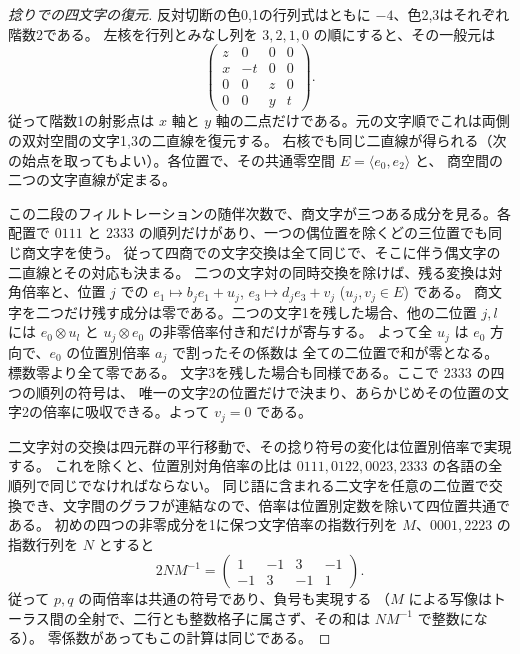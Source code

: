 \begin{proof}[捻りでの四文字の復元]
反対切断の色0,1の行列式はともに $-4$、色2,3はそれぞれ階数2である。
左核を行列とみなし列を $3,2,1,0$ の順にすると、その一般元は
\[
 \begin{pmatrix}z&0&0&0\\x&-t&0&0\\0&0&z&0\\0&0&y&t\end{pmatrix}.
\]
従って階数1の射影点は $x$ 軸と $y$ 軸の二点だけである。元の文字順でこれは両側の双対空間の文字1,3の二直線を復元する。
右核でも同じ二直線が得られる（次の始点を取ってもよい）。各位置で、その共通零空間 $E=\langle e_0,e_2\rangle$ と、
商空間の二つの文字直線が定まる。

この二段のフィルトレーションの随伴次数で、商文字が三つある成分を見る。各配置で
$0111$ と $2333$ の順列だけがあり、一つの偶位置を除くどの三位置でも同じ商文字を使う。
従って四商での文字交換は全て同じで、そこに伴う偶文字の二直線とその対応も決まる。
二つの文字対の同時交換を除けば、残る変換は対角倍率と、位置 $j$ での
$e_1\mapsto b_j e_1+u_j$, $e_3\mapsto d_j e_3+v_j$ ($u_j,v_j\in E$) である。
商文字を二つだけ残す成分は零である。二つの文字1を残した場合、他の二位置 $j,l$ には
$e_0\otimes u_l$ と $u_j\otimes e_0$ の非零倍率付き和だけが寄与する。
よって全 $u_j$ は $e_0$ 方向で、$e_0$ の位置別倍率 $a_j$ で割ったその係数は
全ての二位置で和が零となる。標数零より全て零である。
文字3を残した場合も同様である。ここで $2333$ の四つの順列の符号は、
唯一の文字2の位置だけで決まり、あらかじめその位置の文字2の倍率に吸収できる。よって $v_j=0$ である。

二文字対の交換は四元群の平行移動で、その捻り符号の変化は位置別倍率で実現する。
これを除くと、位置別対角倍率の比は $0111,0122,0023,2333$ の各語の全順列で同じでなければならない。
同じ語に含まれる二文字を任意の二位置で交換でき、文字間のグラフが連結なので、倍率は位置別定数を除いて四位置共通である。
初めの四つの非零成分を1に保つ文字倍率の指数行列を $M$、$0001,2223$ の指数行列を $N$ とすると
\[
 2NM^{-1}=\begin{pmatrix}1&-1&3&-1\\-1&3&-1&1\end{pmatrix}.
\]
従って $p,q$ の両倍率は共通の符号であり、負号も実現する
（$M$ による写像はトーラス間の全射で、二行とも整数格子に属さず、その和は $NM^{-1}$ で整数になる）。
零係数があってもこの計算は同じである。
\end{proof}


